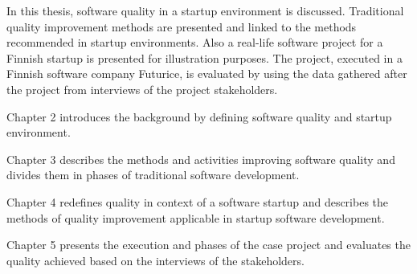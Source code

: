 
In this thesis, software quality in a startup environment is discussed. Traditional quality improvement methods are presented and linked to the methods recommended in startup environments. Also a real-life software project for a Finnish startup is presented for illustration purposes. The project, executed in a Finnish software company Futurice, is evaluated by using the data gathered after the project from interviews of the project stakeholders.


Chapter 2 introduces the background by defining software quality and startup environment.

Chapter 3 describes the methods and activities improving software quality and divides them in phases of traditional software development.

Chapter 4 redefines quality in context of a software startup and describes the methods of quality improvement applicable in startup software development.

Chapter 5 presents the execution and phases of the case project and evaluates the quality achieved based on the interviews of the stakeholders.
